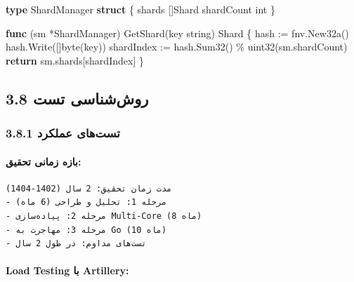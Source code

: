 \documentclass[
]{article}
\newenvironment{Shaded}{}{}
\newcommand{\ControlFlowTok}[1]{\textcolor[rgb]{0.00,0.44,0.13}{\textbf{#1}}}
\newcommand{\DataTypeTok}[1]{\textcolor[rgb]{0.56,0.13,0.00}{#1}}
\newcommand{\KeywordTok}[1]{\textcolor[rgb]{0.00,0.44,0.13}{\textbf{#1}}}
\newcommand{\NormalTok}[1]{#1}
\newcommand{\OperatorTok}[1]{\textcolor[rgb]{0.40,0.40,0.40}{#1}}
\begin{document}
\begin{Shaded}
\begin{Highlighting}[]
\KeywordTok{type}\NormalTok{ ShardManager }\KeywordTok{struct} \OperatorTok{\{}
\NormalTok{    shards }\OperatorTok{[]}\NormalTok{Shard}
\NormalTok{    shardCount }\DataTypeTok{int}
\OperatorTok{\}}

\KeywordTok{func} \OperatorTok{(}\NormalTok{sm }\OperatorTok{*}\NormalTok{ShardManager}\OperatorTok{)}\NormalTok{ GetShard}\OperatorTok{(}\NormalTok{key }\DataTypeTok{string}\OperatorTok{)}\NormalTok{ Shard }\OperatorTok{\{}
\NormalTok{    hash }\OperatorTok{:=}\NormalTok{ fnv}\OperatorTok{.}\NormalTok{New32a}\OperatorTok{()}
\NormalTok{    hash}\OperatorTok{.}\NormalTok{Write}\OperatorTok{([]}\DataTypeTok{byte}\OperatorTok{(}\NormalTok{key}\OperatorTok{))}
\NormalTok{    shardIndex }\OperatorTok{:=}\NormalTok{ hash}\OperatorTok{.}\NormalTok{Sum32}\OperatorTok{()} \OperatorTok{\%} \DataTypeTok{uint32}\OperatorTok{(}\NormalTok{sm}\OperatorTok{.}\NormalTok{shardCount}\OperatorTok{)}
    \ControlFlowTok{return}\NormalTok{ sm}\OperatorTok{.}\NormalTok{shards}\OperatorTok{[}\NormalTok{shardIndex}\OperatorTok{]}
\OperatorTok{\}}
\end{Highlighting}
\end{Shaded}

\subsection{3.8 روش‌شناسی
تست}\label{ux631ux648ux634ux634ux646ux627ux633ux6cc-ux62aux633ux62a}

\subsubsection{3.8.1 تست‌های
عملکرد}\label{ux62aux633ux62aux647ux627ux6cc-ux639ux645ux644ux6a9ux631ux62f}

\paragraph{بازه زمانی
تحقیق:}\label{ux628ux627ux632ux647-ux632ux645ux627ux646ux6cc-ux62aux62dux642ux6ccux642}

\begin{verbatim}
مدت زمان تحقیق: 2 سال (1402-1404)
- مرحله 1: تحلیل و طراحی (6 ماه)
- مرحله 2: پیاده‌سازی Multi-Core (8 ماه)
- مرحله 3: مهاجرت به Go (10 ماه)
- تست‌های مداوم: در طول 2 سال
\end{verbatim}

\paragraph{Load Testing با
Artillery:}\label{load-testing-ux628ux627-artillery}
\end{document}

